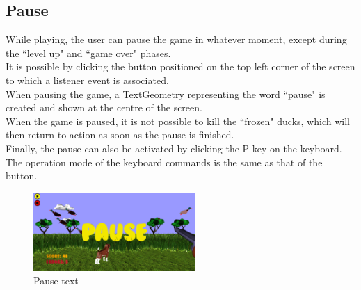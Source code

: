 \documentclass[12pt,a4paper]{article}
\begin{document}
	\subsection{Pause}
	While playing, the user can pause the game in whatever moment, except during the ``level up" and ``game over" phases.\\
	It is possible by clicking the button positioned on the top left corner of the screen to which a listener event is associated.\\
	When pausing the game, a TextGeometry representing the word ``pause" is created and shown at the centre of the screen.\\
	When the game is paused, it is not possible to kill the ``frozen" ducks, which will then return to action as soon as the pause is finished.\\
	Finally, the pause can also be activated by clicking the P key on the keyboard. The operation mode of the keyboard commands is the same as that of the button.
	\begin{figure}[hbt!]
		\centering
		\includegraphics[width=0.55\textwidth]{pause}
		\caption{Pause text}
		\label{fig6}
	\end{figure}
\end{document}
